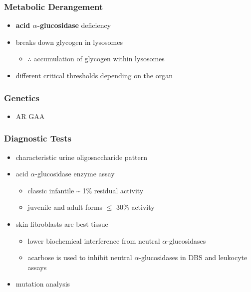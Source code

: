 \documentclass[12pt]{scrartcl}
\begin{document}
\subsubsection{Metabolic Derangement}
\label{sec:org9532dbc}
\begin{itemize}
\item \textbf{acid \(\alpha\)-glucosidase} deficiency
\item breaks down glycogen in lysosomes
\begin{itemize}
\item \(\therefore\) accumulation of glycogen within lysosomes
\end{itemize}
\item different critical thresholds depending on the organ
\end{itemize}
\subsubsection{Genetics}
\label{sec:org029a7a8}
\begin{itemize}
\item AR GAA
\end{itemize}

\subsubsection{Diagnostic Tests}
\label{sec:org6085fef}
\begin{itemize}
\item characteristic urine oligosaccharide pattern
\item acid \(\alpha\)-glucosidase enzyme assay
\begin{itemize}
\item classic infantile \textasciitilde{} 1\% residual activity
\item juvenile and adult forms \(\le\) 30\% activity
\end{itemize}
\item skin fibroblasts are best tissue
\begin{itemize}
\item lower biochemical interference from neutral \(\alpha\)-glucosidases
\item acarbose is used to inhibit neutral \(\alpha\)-glucosidases in DBS and leukocyte assays
\end{itemize}
\item mutation analysis
\end{itemize}
\end{document}
